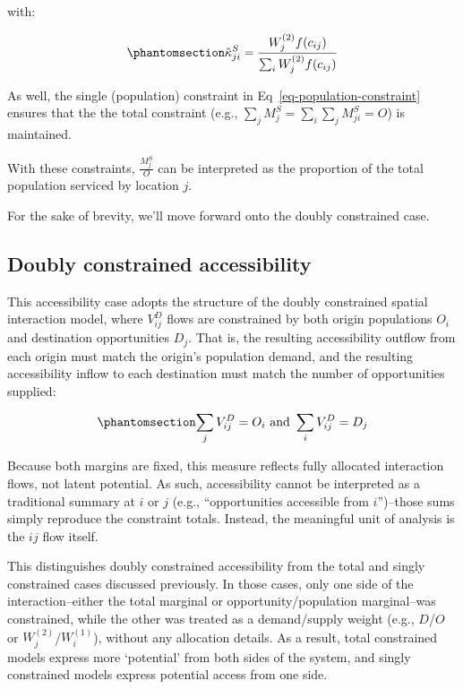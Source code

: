\documentclass[
  10pt,
  letterpaper,
]{article}
\begin{document}
\noindent with:

\begin{equation}\phantomsection\label{eq-attraction-constrained-proportional-allocation-factor}{
\hat \kappa^S_{ji} = \frac{W_j^{(2)} f(c_{ij})}{\sum_i W_j^{(2)} f(c_{ij})}
}\end{equation}

As well, the single (population) constraint in
Eq~\ref{eq-population-constraint} ensures that the the total constraint
(e.g., \(\sum_j M^S_{j} = \sum_i\sum_j  M^S_{ji} = O\)) is maintained.

With these constraints, \(\frac{M_j^S}{O}\) can be interpreted as the
proportion of the total population serviced by location \(j\).

For the sake of brevity, we'll move forward onto the doubly constrained
case.

\subsection{Doubly constrained
accessibility}\label{doubly-constrained-accessibility}

This accessibility case adopts the structure of the doubly constrained
spatial interaction model, where \(V_{ij}^D\) flows are constrained by
both origin populations \(O_i\) and destination opportunities \(D_j\).
That is, the resulting accessibility outflow from each origin must match
the origin's population demand, and the resulting accessibility inflow
to each destination must match the number of opportunities supplied:

\begin{equation}\phantomsection\label{eq-opportunity-population-equality-1}{
\sum_j V_{ij}^D = O_i \text{ and }  \sum_i V_{ij}^D =  D_j
}\end{equation}

Because both margins are fixed, this measure reflects fully allocated
interaction flows, not latent potential. As such, accessibility cannot
be interpreted as a traditional summary at \(i\) or \(j\) (e.g.,
``opportunities accessible from \(i\)'')--those sums simply reproduce
the constraint totals. Instead, the meaningful unit of analysis is the
\(ij\) flow itself.

This distinguishes doubly constrained accessibility from the total and
singly constrained cases discussed previously. In those cases, only one
side of the interaction--either the total marginal or
opportunity/population marginal--was constrained, while the other was
treated as a demand/supply weight (e.g., \(D\)/\(O\) or
\(W_j^{(2)}\)/\(W_i^{(1)}\)), without any allocation details. As a
result, total constrained models express more `potential' from both
sides of the system, and singly constrained models express potential
access from one side.
\end{document}
